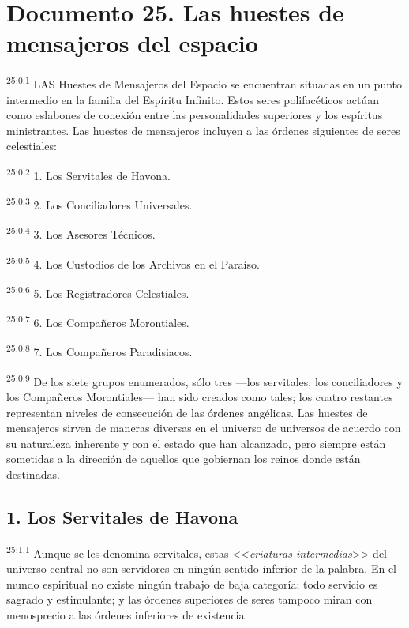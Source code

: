 \chapter{Documento 25. Las huestes de mensajeros del espacio}
\par
\textsuperscript{25:0.1} LAS Huestes de Mensajeros del Espacio se encuentran situadas en un punto intermedio en la familia del Espíritu Infinito. Estos seres polifacéticos actúan como eslabones de conexión entre las personalidades superiores y los espíritus ministrantes. Las huestes de mensajeros incluyen a las órdenes siguientes de seres celestiales:

\par
\textsuperscript{25:0.2} 1. Los Servitales de Havona.

\par
\textsuperscript{25:0.3} 2. Los Conciliadores Universales.

\par
\textsuperscript{25:0.4} 3. Los Asesores Técnicos.

\par
\textsuperscript{25:0.5} 4. Los Custodios de los Archivos en el Paraíso.

\par
\textsuperscript{25:0.6} 5. Los Registradores Celestiales.

\par
\textsuperscript{25:0.7} 6. Los Compañeros Morontiales.

\par
\textsuperscript{25:0.8} 7. Los Compañeros Paradisiacos.

\par
\textsuperscript{25:0.9} De los siete grupos enumerados, sólo tres ---los servitales, los conciliadores y los Compañeros Morontiales--- han sido creados como tales; los cuatro restantes representan niveles de consecución de las órdenes angélicas. Las huestes de mensajeros sirven de maneras diversas en el universo de universos de acuerdo con su naturaleza inherente y con el estado que han alcanzado, pero siempre están sometidas a la dirección de aquellos que gobiernan los reinos donde están destinadas.

\section*{1. Los Servitales de Havona}
\par
\textsuperscript{25:1.1} Aunque se les denomina servitales, estas <<\textit{criaturas intermedias}>> del universo central no son servidores en ningún sentido inferior de la palabra. En el mundo espiritual no existe ningún trabajo de baja categoría; todo servicio es sagrado y estimulante; y las órdenes superiores de seres tampoco miran con menosprecio a las órdenes inferiores de existencia.

